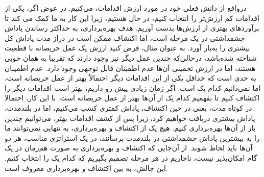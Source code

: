 درواقع از دانش فعلی خود در مورد ارزش اقدامات،  می‌کنیم. در عوض اگر،
یکی از اقدامات کم ارزش‌تر را انتخاب کنیم، در حال  هستیم، زیرا این کار به ما کمک می \nf کند تا برآوردهای بهتری از ارزش‌ها بدست آوریم. هدف بهره‌برداری، به حداکثر رساندن پاداش چشمداشتی در یک مرحله است، اما اکتشاف ممکن است در دراز مدت پاداش کل بیشتری را به‌بار‌ آورد.
به عنوان مثال، فرض کنید ارزش یک عمل حریصانه با قطعیت شناخته شده‌باشد، در‌حالی‌‌که چندین عمل دیگر نیز وجود دارند که
تقریبا به همان خوبی  هستند، اما در ارزش تخمینی آن‌ها عدم اطمینان قابل توجهی  وجود دارد. عدم اطمینان به حدی است که حداقل
یکی از این اقدامات دیگر احتمالاً بهتر از عمل حریصانه است، اما نمی‌دانیم کدام یک است.
اگر زمان زیادی پیش رو داریم، بهتر است
اقدامات دیگر را اکتشاف کنیم تا بفهمیم کدام یک از آن‌ها بهتر از عمل حریصانه است. با این کار، احتمالا در کوتاه مدت، یعنی در حین اکتشاف، پاداش کمتری کسب می‌کنیم، اما در بلندمدت، پاداش بیشتری دریافت خواهیم کرد، زیرا پس از کشف اقدامات بهتر، می‌توانیم چندین بار از آن‌ها بهره‌برداری کنیم. 
هیچ یک از اکتشاف و بهره‌برداری، به تنهایی نمی‌توانند ما را به بیشترین پاداش چشمداشتی در بلندمدت برسانند، در یک استراتژی مناسب، هر دو آن‌ها باید لحاظ شوند. از آن‌جایی که اکتشاف و بهره‌برداری به صورت هم‌زمان در یک گام امکان‌پذیر نیست، ناچاریم در هر مرحله تصمیم بگیریم که کدام یک را انتخاب کنیم. این چالش، به  بین اکتشاف و بهره‌برداری معروف است.



